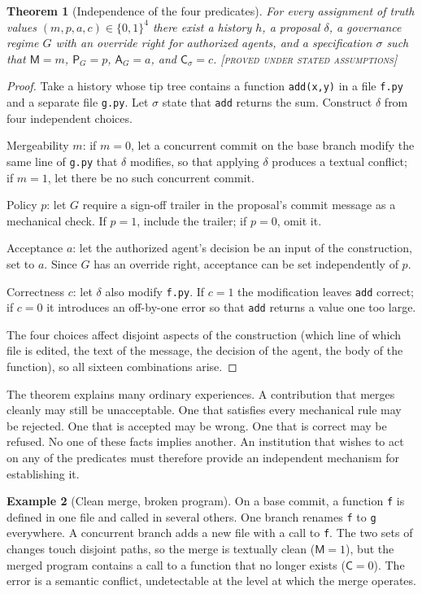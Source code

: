 \documentclass[11pt,twoside,openright]{book}
\theoremstyle{plain}
\newtheorem{theorem}{Theorem}[chapter]
\theoremstyle{definition}
\newtheorem{example}[theorem]{Example}
\theoremstyle{remark}
\newcommand{\Proved}{\textup{\textsc{[proved under stated assumptions]}}}
\begin{document}
\begin{theorem}[Independence of the four predicates]\label{thm:fourindep}
For every assignment of truth values $(m,p,a,c)\in\{0,1\}^4$ there exist a history $h$, a proposal $\delta$, a governance regime $G$ with an override right for authorized agents, and a specification $\sigma$ such that $\mathsf{M}=m$, $\mathsf{P}_G=p$, $\mathsf{A}_G=a$, and $\mathsf{C}_\sigma=c$.
\Proved{}
\end{theorem}

\begin{proof}
Take a history whose tip tree contains a function \texttt{add(x,y)} in a file \texttt{f.py} and a separate file \texttt{g.py}. Let $\sigma$ state that \texttt{add} returns the sum. Construct $\delta$ from four independent choices.

Mergeability $m$: if $m=0$, let a concurrent commit on the base branch modify the same line of \texttt{g.py} that $\delta$ modifies, so that applying $\delta$ produces a textual conflict; if $m=1$, let there be no such concurrent commit.

Policy $p$: let $G$ require a sign-off trailer in the proposal's commit message as a mechanical check. If $p=1$, include the trailer; if $p=0$, omit it.

Acceptance $a$: let the authorized agent's decision be an input of the construction, set to $a$. Since $G$ has an override right, acceptance can be set independently of $p$.

Correctness $c$: let $\delta$ also modify \texttt{f.py}. If $c=1$ the modification leaves \texttt{add} correct; if $c=0$ it introduces an off-by-one error so that \texttt{add} returns a value one too large.

The four choices affect disjoint aspects of the construction (which line of which file is edited, the text of the message, the decision of the agent, the body of the function), so all sixteen combinations arise.
\end{proof}

The theorem explains many ordinary experiences. A contribution that merges cleanly may still be unacceptable. One that satisfies every mechanical rule may be rejected. One that is accepted may be wrong. One that is correct may be refused. No one of these facts implies another. An institution that wishes to act on any of the predicates must therefore provide an independent mechanism for establishing it.

\begin{example}[Clean merge, broken program]\label{ex:semanticconflict}
On a base commit, a function \texttt{f} is defined in one file and called in several others. One branch renames \texttt{f} to \texttt{g} everywhere. A concurrent branch adds a new file with a call to \texttt{f}. The two sets of changes touch disjoint paths, so the merge is textually clean ($\mathsf{M}=1$), but the merged program contains a call to a function that no longer exists ($\mathsf{C}=0$). The error is a semantic conflict, undetectable at the level at which the merge operates.
\end{example}
\end{document}
